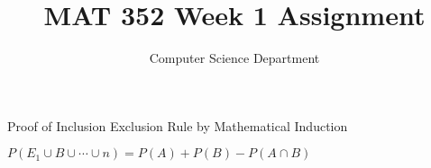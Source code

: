 \documentclass[twoside]{article}
\title{\textbf{MAT 352 Week 1 Assignment}}
\author{Computer Science Department}
\date{
	\today\endgraf\endgraf\vspace{200px}
	\section*{Question}
	Proof the Inclusion Exclusion Rule by Mathematical Induction
}
\begin{document}
\maketitle

\newpage
{}
\pagestyle{fancy}
\fancyhead{}

Proof of Inclusion Exclusion Rule by Mathematical Induction

$P(E_1 \cup B \cup \cdots \cup n) = P(A) + P(B) - P(A \cap B)$
\end{document}
